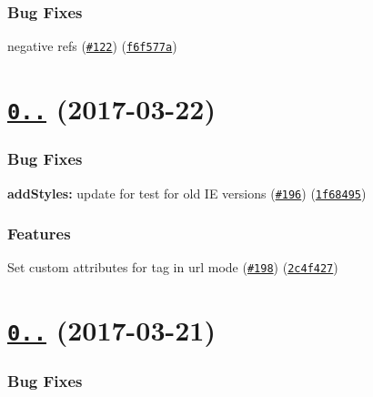 \subsubsection*{Bug Fixes}


\begin{DoxyItemize}
\item negative refs (\href{https://github.com/webpack/style-loader/issues/122}{\tt \#122}) (\href{https://github.com/webpack/style-loader/commit/f6f577a}{\tt f6f577a})
\end{DoxyItemize}

\label{_0.16.0}%
 \section*{\href{https://github.com/webpack/style-loader/compare/v0.15.0...v0.16.0}{\tt 0..} (2017-\/03-\/22)}

\subsubsection*{Bug Fixes}


\begin{DoxyItemize}
\item {\bfseries add\+Styles\+:} update for test for old IE versions (\href{https://github.com/webpack/style-loader/issues/196}{\tt \#196}) (\href{https://github.com/webpack/style-loader/commit/1f68495}{\tt 1f68495})
\end{DoxyItemize}

\subsubsection*{Features}


\begin{DoxyItemize}
\item Set custom attributes for tag in url mode (\href{https://github.com/webpack/style-loader/issues/198}{\tt \#198}) (\href{https://github.com/webpack/style-loader/commit/2c4f427}{\tt 2c4f427})
\end{DoxyItemize}

\label{_0.15.0}%
 \section*{\href{https://github.com/webpack/style-loader/compare/v0.14.1...v0.15.0}{\tt 0..} (2017-\/03-\/21)}

\subsubsection*{Bug Fixes}


